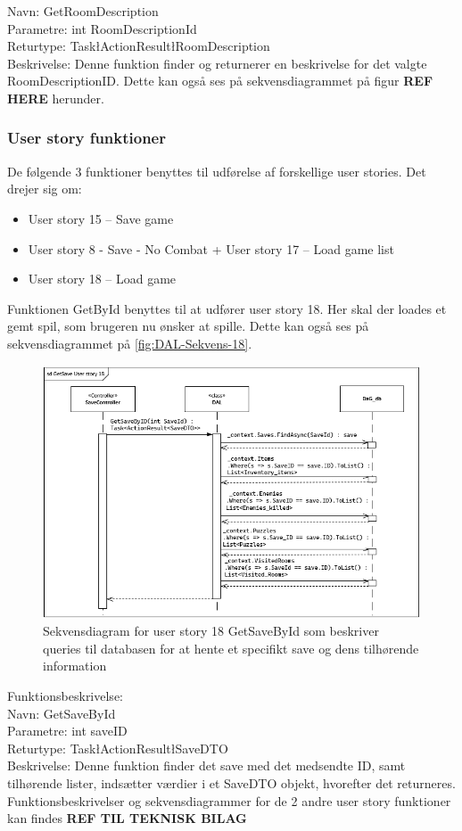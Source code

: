 Navn: GetRoomDescription \\
Parametre: int RoomDescriptionId \\
Returtype: Task\l ActionResult\l RoomDescription\g\g\\
Beskrivelse: Denne funktion finder og returnerer en beskrivelse for det valgte RoomDescriptionID. 
Dette kan også ses på sekvensdiagrammet på figur \textbf{REF HERE} herunder.


\subsubsection{User story funktioner}
De følgende 3 funktioner benyttes til udførelse af forskellige user stories.
Det drejer sig om:
\begin{itemize}
\item User story 15 – Save game
\item User story 8 - Save - No Combat  + User story 17 – Load game list 
\item User story 18 – Load game \\
\end{itemize}

Funktionen GetById benyttes til at udfører user story 18.
Her skal der loades et gemt spil, som brugeren nu ønsker at spille. 
Dette kan også ses på sekvensdiagrammet på \autoref{fig:DAL-Sekvens-18}.\\

\begin{figure}[H]
\centering
\includegraphics[width = \textwidth]{02-Body/Images/DAL-Database/GetSavesByIdSd.PNG}
\caption{Sekvensdiagram for user story 18 GetSaveById som beskriver queries til databasen for at hente et specifikt save og dens tilhørende information}
\label{fig:DAL-Sekvens-18}
\end{figure}

Funktionsbeskrivelse:\\
Navn: GetSaveById \\
Parametre: int saveID\\
Returtype: Task\l ActionResult\l SaveDTO\g\g\\
Beskrivelse: Denne funktion finder det save med det medsendte ID, samt tilhørende lister, indsætter værdier i et SaveDTO objekt, hvorefter det returneres.\\

Funktionsbeskrivelser og sekvensdiagrammer for de 2 andre user story funktioner kan findes \textbf{REF TIL TEKNISK BILAG}